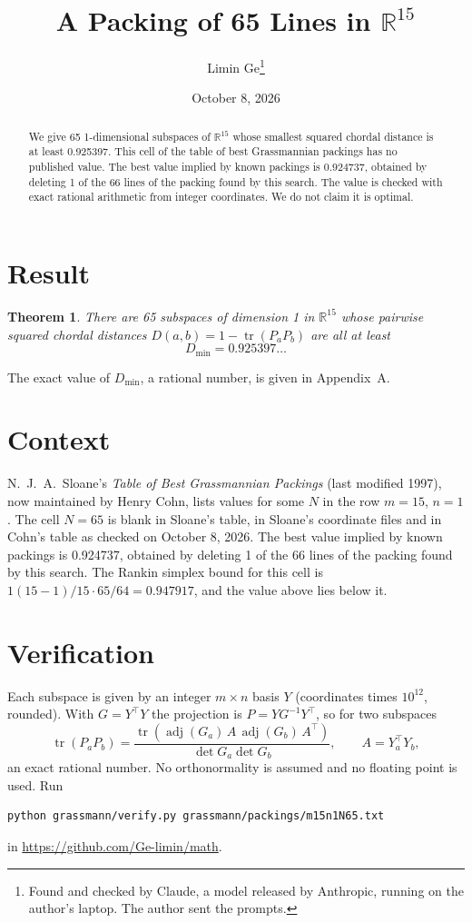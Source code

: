 \documentclass[11pt,a4paper]{article}
\title{A Packing of 65 Lines in $\mathbb{R}^{15}$}
\author{Limin Ge\thanks{Found and checked by Claude, a model released by Anthropic, running on the author's laptop. The author sent the prompts.}}
\date{October 8, 2026}
\newtheorem*{theorem}{Theorem}
\begin{document}
\maketitle
\begin{abstract}
We give 65 1-dimensional subspaces of $\mathbb{R}^{15}$ whose smallest squared chordal distance is at least 0.925397. This cell of the table of best Grassmannian packings has no published value. The best value implied by known packings is 0.924737, obtained by deleting 1 of the 66 lines of the packing found by this search. The value is checked with exact rational arithmetic from integer coordinates. We do not claim it is optimal.
\end{abstract}

\section{Result}
\begin{theorem}
There are 65 subspaces of dimension 1 in $\mathbb{R}^{15}$ whose pairwise squared chordal distances $D(a,b) = 1 - \operatorname{tr}(P_aP_b)$ are all at least
\[ D_{\min} = 0.925397\ldots \]
\end{theorem}
The exact value of $D_{\min}$, a rational number, is given in Appendix~A.


\section{Context}
N.~J.~A.~Sloane's \emph{Table of Best Grassmannian Packings} (last modified 1997), now maintained by Henry Cohn, lists values for some $N$ in the row $m=15$, $n=1$. The cell $N=65$ is blank in Sloane's table, in Sloane's coordinate files and in Cohn's table as checked on October 8, 2026. The best value implied by known packings is 0.924737, obtained by deleting 1 of the 66 lines of the packing found by this search. The Rankin simplex bound for this cell is $1(15-1)/15\cdot 65/64 = 0.947917$, and the value above lies below it.


\section{Verification}
Each subspace is given by an integer $m\times n$ basis $Y$ (coordinates times $10^{12}$, rounded). With $G=Y^\top Y$ the projection is $P=YG^{-1}Y^\top$, so for two subspaces
\[ \operatorname{tr}(P_aP_b)=\frac{\operatorname{tr}(\operatorname{adj}(G_a)\,A\,\operatorname{adj}(G_b)\,A^\top)}{\det G_a\det G_b},\qquad A=Y_a^\top Y_b, \]
an exact rational number. No orthonormality is assumed and no floating point is used. Run
\begin{verbatim}
python grassmann/verify.py grassmann/packings/m15n1N65.txt
\end{verbatim}
in \url{https://github.com/Ge-limin/math}.
\end{document}
